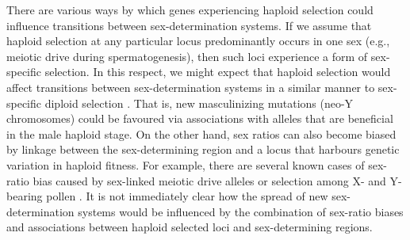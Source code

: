 \documentclass[12pt]{article}
\begin{document}
There are various ways by which genes experiencing haploid selection could influence transitions between sex-determination systems. 
If we assume that haploid selection at any particular locus predominantly occurs in one sex (e.g., meiotic drive during spermatogenesis), then such loci experience a form of sex-specific selection. 
In this respect, we might expect that haploid selection would affect transitions between sex-determination systems in a similar manner to sex-specific diploid selection \citep[as explored by][]{vanDoorn:2007eu,vanDoorn:2010hu}. 
That is, new masculinizing mutations (neo-Y chromosomes) could be favoured via associations with alleles that are beneficial in the male haploid stage. 
On the other hand, sex ratios can also become biased by linkage between the sex-determining region and a locus that harbours genetic variation in haploid fitness. 
For example, there are several known cases of sex-ratio bias caused by sex-linked meiotic drive alleles \citep[][Chapter 3]{Burt:2006} or selection among X- and Y-bearing pollen \citep{Lloyd:1974tz,Conn:1981uw,Stehlik:2005ul,Stehlik:2006to,Field:2012fd,Field:2013cc}. 
It is not immediately clear how the spread of new sex-determination systems would be influenced by the combination of sex-ratio biases and associations between haploid selected loci and sex-determining regions. 

\end{document}
